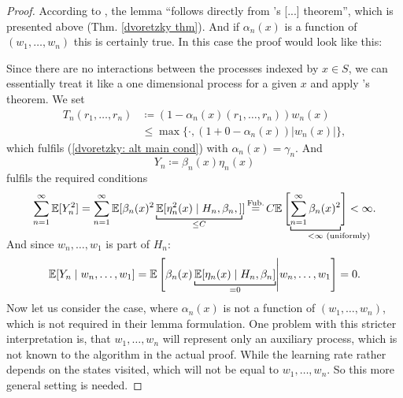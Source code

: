 \begin{proof}
    According to \citeauthor{jaakkolaConvergenceStochasticIterative1994a}, the lemma ``follows directly from \citeauthor{dvoretzkyStochasticApproximation1956}'s [...] theorem'', which is presented above (Thm. \ref{dvoretzky thm}). And if \(\alpha_n(x)\) is a function of \((w_1, \dots, w_n)\) this is certainly true. In this case the proof would look like this:

    Since there are no interactions between the processes indexed by \(x\in S\), we can essentially treat it like a one dimensional process for a given \(x\) and apply \citeauthor{dvoretzkyStochasticApproximation1956}'s theorem. 
    We set
    \begin{align}
        T_n(r_1,\dots, r_n)
        &\coloneqq (1-\alpha_n(x)(r_1,\dots,r_n)) w_n(x) \nonumber\\
        &\le \max\{\cdot, (1+ 0 -\alpha_n(x))|w_n(x)|\}, \label{dvoretzky application}
    \end{align}
    which fulfils (\ref{dvoretzky: alt main cond}) with \(\alpha_n(x)=\gamma_n\). And
    \[
       Y_n\coloneqq \beta_n(x) \eta_n(x)
    \]
    fulfils the required conditions
    \[
        \sum_{n=1}^\infty \E[Y_n^2] 
        = \sum_{n=1}^\infty \E[\beta_n(x)^2\underbracket[0.7pt]{\E[\eta_n^2(x)\mid H_n,\beta_n,]}_{\le C}]
        \xeq{\text{Fub.}} C \E\left[\vphantom{\sum_{n=1}^\infty}
            \smash{\underbracket[0.7pt]{
                \sum_{n=1}^\infty \beta_n(x)^2}_{
                <\infty \mathrlap{\text{ (uniformly)}}
                }}
        \right] <\infty.
    \]
    And since \(w_n,\dots, w_1\) is part of \(H_n\):
    \[
        \E[Y_n\mid w_n,\dots, w_1]=\E\left[\beta_n(x) \underbracket[0.7pt]{\E[\eta_n(x)\mid H_n, \beta_n]}_{\smash{=0}}   \middle| w_n,\dots, w_1\right]=0.
    \]
    Now let us consider the case, where \(\alpha_n(x)\) is not a function of \((w_1,\dots,w_n)\), which is not required in their lemma formulation. One problem with this stricter interpretation is, that \(w_1,\dots,w_n\) will represent only an auxiliary process, which is not known to the algorithm in the actual proof. While the learning rate rather depends on the states visited, which will not be equal to \(w_1,\dots, w_n\). So this more general setting is needed.
    

\end{proof}
